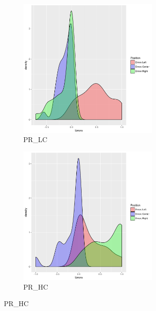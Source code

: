 \begin{figure}[h]
	
	\begin{subfigure}{0.5\textwidth}
		\includegraphics[width=1\linewidth, height=7cm]{../../results/figures/errorDistributionPR_LC} 
		\caption{PR\_LC}
		\label{fig:errdistsubim1}
	\end{subfigure}
	\begin{subfigure}{0.5\textwidth}
		\includegraphics[width=1\linewidth, height=7cm]{../../results/figures/errorDistributionPR_HC}
		\caption{PR\_HC}
		\label{fig:errdistsubim2}
	\end{subfigure}


\end{figure}
